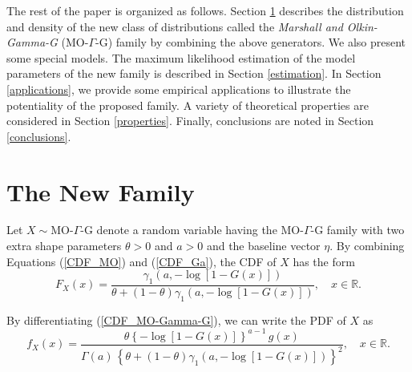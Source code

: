 \documentclass[12pt,a4paper]{article} %
\begin{document}
The rest of the paper is organized as follows. Section \ref{sec:MOGaG} describes the distribution and density
of the new class of distributions called the {\it Marshall and Olkin-Gamma-G} (MO-$\Gamma$-G) family  by combining the above generators.
We also present some special models. The maximum likelihood estimation of the model parameters of the new family is
described in Section \ref{estimation}. In Section \ref{applications}, we provide some empirical applications to illustrate
the potentiality of the proposed family. A variety of theoretical properties are considered in Section \ref{properties}.
Finally, conclusions are noted in Section \ref{conclusions}.


\section{The New Family}\label{sec:MOGaG}

Let $X\sim$MO-$\Gamma$-G denote a random variable having the MO-$\Gamma$-G family with two extra shape parameters $\theta>0$ and $a>0$
and the baseline vector $\eta$. By combining Equations (\ref{CDF_MO}) and (\ref{CDF_Ga}), the CDF of $X$ has the form
\begin{equation}\label{CDF_MO-Gamma-G}
F_{X}(x)=\frac{\gamma_1\left( a, -\log \left[1-G(x)\right]\right)}{\theta+(1-\theta)\gamma_1\left( a, -\log \left[1-G(x)\right]\right)},\quad x \in \mathbb{R}.
\end{equation}

By differentiating (\ref{CDF_MO-Gamma-G}), we can write the PDF of $X$ as
\begin{equation}\label{CDF_MO-Gamma-G}
f_{X}(x)=\frac{\theta  \left\{ -\log[1-G(x)] \right\}^{a-1}\, g(x)}{\Gamma(a)\,\left\{\theta+(1-\theta)\gamma_1\left( a, -\log \left[1-G(x)\right]\right)\right\}^{2}},\quad x \in \mathbb{R}.
\end{equation}
\end{document}
